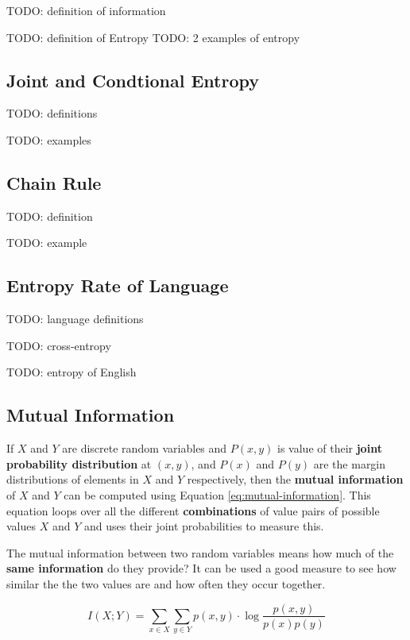 \documentclass{article}
\begin{document}
TODO: definition of information

TODO: definition of Entropy
TODO: 2 examples of entropy

\subsection{Joint and Condtional Entropy} 

TODO: definitions

TODO: examples

\subsection{Chain Rule}

TODO: definition

TODO: example

\subsection{Entropy Rate of Language}

TODO: language definitions

TODO: cross-entropy

TODO: entropy of English

\subsection{Mutual Information}
\label{sec:mutual-information}

If $X$ and $Y$ are discrete random variables and $P(x, y)$ is value of their \textbf{joint probability distribution} at $(x, y)$, and $P(x)$ and $P(y)$ are the margin distributions of elements in $X$ and $Y$ respectively, then the \textbf{mutual information} of $X$ and $Y$ can be computed using Equation \ref{eq:mutual-information}. This equation loops over all the different \textbf{combinations} of value pairs of possible values $X$ and $Y$ and uses their joint probabilities to measure this.

The mutual information between two random variables means how much of the \textbf{same information} do they provide? It can be used a good measure to see how similar the the two values are and how often they occur together.

\begin{equation}
	I(X;Y) = \sum_{x \in X} { \sum_{y \in Y} {
		p(x, y) \cdot \log{\frac{p(x,y)}{p(x)p(y)}}
	} }
	\label{eq:mutual-information}
\end{equation}
\end{document}
